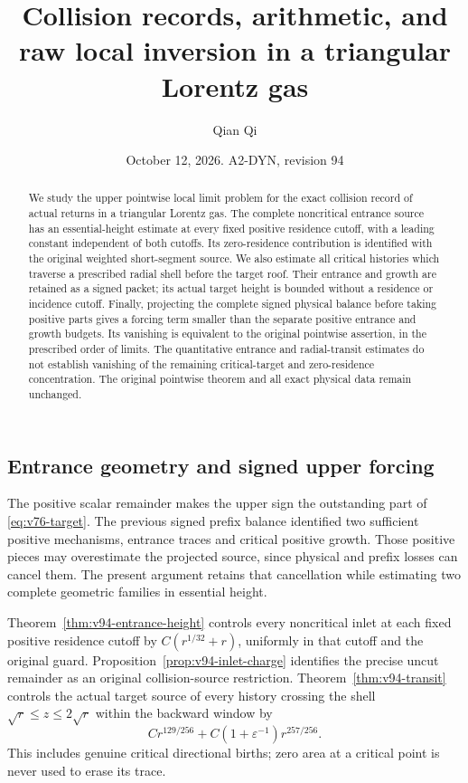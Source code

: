 \documentclass[11pt,reqno]{amsart}
\title[Collision records and raw local inversion]{Collision records, arithmetic, and raw local inversion in a triangular Lorentz gas}
\author{Qian Qi}
\date{October 12, 2026. A2-DYN, revision 94}
\numberwithin{equation}{section}
\theoremstyle{definition}
\theoremstyle{remark}\newtheorem{remark}[theorem]{Remark}
\begin{document}
\raggedbottom
\begin{abstract}
We study the upper pointwise local limit problem for the exact collision
record of actual returns in a triangular Lorentz gas. The complete
noncritical entrance source has an essential-height estimate at every
fixed positive residence cutoff, with a leading constant independent
of both cutoffs. Its zero-residence contribution is identified with
the original weighted short-segment source. We also estimate all
critical histories which traverse a prescribed radial shell before
the target roof. Their entrance and growth are retained as a signed
packet; its actual target height is bounded without a residence or
incidence cutoff. Finally, projecting the complete signed physical
balance before taking positive parts gives a forcing term smaller
than the separate positive entrance and growth budgets. Its vanishing
is equivalent to the original pointwise assertion, in the prescribed
order of limits. The quantitative entrance and radial-transit estimates
do not establish vanishing of the remaining critical-target and
zero-residence concentration. The original pointwise theorem and all
exact physical data remain unchanged.
\end{abstract}
\maketitle


\subsection{Entrance geometry and signed upper forcing}
The positive scalar remainder makes the upper sign the outstanding
part of \eqref{eq:v76-target}. The previous signed prefix balance
identified two sufficient positive mechanisms, entrance traces and
critical positive growth. Those positive pieces may overestimate the
projected source, since physical and prefix losses can cancel them.
The present argument retains that cancellation while estimating two
complete geometric families in essential height.

Theorem~\ref{thm:v94-entrance-height} controls every noncritical inlet
at each fixed positive residence cutoff by $C(r^{1/32}+r)$, uniformly
in that cutoff and the original guard. Proposition~\ref{prop:v94-inlet-charge}
identifies the precise uncut remainder as an original collision-source
restriction. Theorem~\ref{thm:v94-transit} controls the actual target
source of every history crossing the shell $\sqrt r\le z\le2\sqrt r$
within the backward window by
\[
 C r^{129/256}+C(1+\varepsilon^{-1})r^{257/256}.
\]
This includes genuine critical directional births; zero area at a
critical point is never used to erase its trace.
\end{document}
